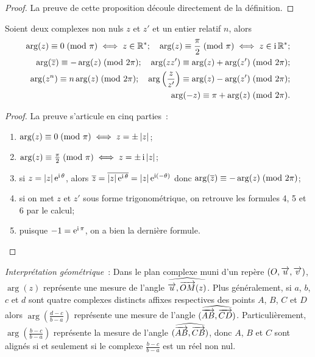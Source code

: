 \begin{proof}
  La preuve de cette proposition découle directement de la définition.
\end{proof}

\begin{prop}
  Soient deux complexes non nuls \(z\) et \(z'\) et un entier relatif \(n\), 
  alors
  \begin{align*}
    \arg(z) \equiv 0\!\pmod {\pi} \iff z \in \mathbb{R}^*; \quad 
    \arg(z) \equiv \frac{\pi}{2}\!\pmod {\pi} \iff z \in \operatorname{i}\mathbb{R}^{*};\\
    \arg(\overline{z}) \equiv -\arg(z)\!\pmod {2\pi}; \quad \arg(z 
    z') \equiv \arg(z) + \arg(z')\!\pmod {2\pi}; \\
    \arg(z^n) \equiv n \arg(z)\!\pmod {2\pi}; \quad \arg 
    \left(\frac{z}{z'} \right) \equiv \arg(z) - \arg(z') \!\pmod {2\pi}; \\
    \arg(-z) \equiv \pi + \arg(z)\!\pmod {2\pi}.
  \end{align*}
\end{prop}

\begin{proof}
  La preuve s'articule en cinq parties~:
  \begin{enumerate}
    \item \(\arg(z) \equiv 0\!\pmod {\pi} \iff z = \pm \left\lvert z\right\rvert\);
    \item \(\arg(z) \equiv \frac{\pi}{2}\!\pmod {\pi} \iff z = \pm \operatorname{i} \left\lvert z\right\rvert\);
    \item si \(z = \left\lvert z\right\rvert \operatorname{e}^{\operatorname{i} \theta}\), alors \(\overline{z} = 
      \overline{|z| \operatorname{e}^{\operatorname{i} \theta}} = |z| \operatorname{e}^{\operatorname{i} (-\theta)}\) donc 
      \(\arg(\overline{z}) \equiv -\arg(z)\!\pmod {2\pi}\);
    \item si on met \(z\) et \(z'\) sous forme trigonométrique, on retrouve 
      les formules 4, 5 et 6 par le calcul;
    \item puisque \(-1 = \operatorname{e}^{\operatorname{i} \pi}\), on a bien la dernière formule.
  \end{enumerate}
\end{proof}

\emph{Interprétation géométrique}~: Dans le plan complexe muni d'un repère 
\((O,\overrightarrow{u}, \overrightarrow{v})\), \(\arg(z)\) représente une mesure de l'angle 
\(\widehat{\overrightarrow{u}, \overrightarrow{OM}(z)}\). Plus généralement, si \(a\), \(b\), \(c\) 
et \(d\) sont quatre complexes distincts affixes respectives des points \(A\), 
\(B\), \(C\) et \(D\) alors \(\arg\left(\frac{d-c}{b-a}\right)\) représente une 
mesure de l'angle \((\widehat{\overrightarrow{AB},\overrightarrow{CD}})\). Particulièrement, 
\(\arg\left(\frac{b-c}{b-a}\right)\) représente la mesure de l'angle 
\((\widehat{\overrightarrow{AB},\overrightarrow{CB}})\), donc \(A\), \(B\) et \(C\) sont alignés si 
et seulement si le complexe \(\frac{b-c}{b-a}\) est un réel non nul.

